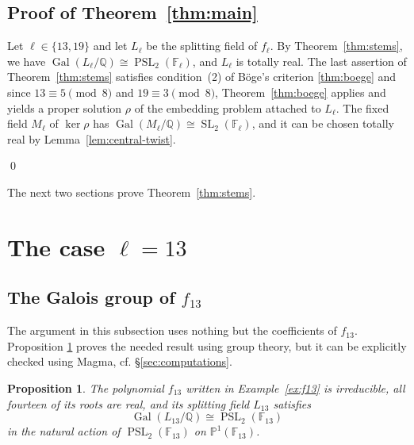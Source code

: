 \documentclass[10pt]{amsart}
\numberwithin{equation}{section}
\newtheorem{proposition}[theorem]{Proposition}
\theoremstyle{definition}
\theoremstyle{remark}
\newcommand{\PP}{\mathbb P}
\newcommand{\F}{\mathbb{F}}
\newcommand{\Q}{\mathbb{Q}}
\newcommand{\SL}{\operatorname{SL}}
\newcommand{\PSL}{\operatorname{PSL}}
\newcommand{\Gal}{\operatorname{Gal}}
\begin{document}
\subsection{Proof of Theorem~\ref{thm:main}}\label{subsec:proof-of-main}
Let $\ell\in\{13,19\}$ and let $L_\ell$ be the splitting field of $f_\ell$. By Theorem~\ref{thm:stems}, we have $\Gal(L_\ell/\Q)\cong\PSL_2(\F_\ell)$, and
$L_\ell$ is totally real. 
The last assertion of
Theorem~\ref{thm:stems} satisfies condition~(2) of B\"oge's criterion \ref{thm:boege} and since $13\equiv5\pmod8$ and
$19\equiv3\pmod8$, Theorem~\ref{thm:boege} applies and yields a proper solution $\rho$ of the embedding problem attached to $L_\ell$. The fixed field $M_\ell$ of $\ker\rho$ has $\Gal(M_\ell/\Q)\cong\SL_2(\F_\ell)$, and it can be chosen totally real by Lemma~\ref{lem:central-twist}.

\qed

\medskip

The next two sections prove Theorem~\ref{thm:stems}.

\section{The case \texorpdfstring{$\ell=13$}{l=13}}\label{sec:l13}

\subsection{The Galois group of \texorpdfstring{$f_{13}$}{f13}}
\label{subsec:l13-group}
The argument in this subsection uses nothing but the coefficients of
$f_{13}$. Proposition \ref{prop:l13-projective} proves the needed result using group theory, but it can be explicitly checked using Magma, cf. \S\ref{sec:computations}.


\begin{proposition}\label{prop:l13-projective}
The polynomial $f_{13}$ written in Example~\ref{ex:f13} is irreducible, all fourteen
of its roots are real, and its splitting field $L_{13}$ satisfies
\[
 \Gal(L_{13}/\Q)\cong\PSL_2(\F_{13})
\]
in the natural action of $\PSL_2(\F_{13})$ on $\PP^1(\F_{13})$.
\end{proposition}
\end{document}

